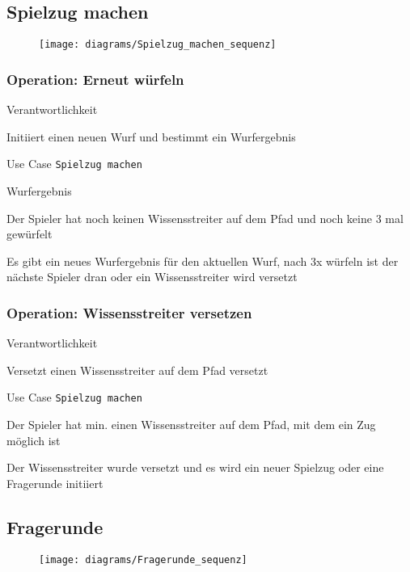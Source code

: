 \newpage
\subsection{Spielzug machen}
\begin{figure}[h]
  \begin{center}
    \texttt{[image: diagrams/Spielzug\_machen\_sequenz]}
  \end{center}
\end{figure}

\subsubsection{Operation: Erneut würfeln}
\begin{labeling}[:]{Verantwortlichkeit}
\item [Verantwortlichkeit] Initiiert einen neuen Wurf und bestimmt ein Wurfergebnis
\item [Referenzen] Use Case \texttt{Spielzug machen}
\item [Output] Wurfergebnis
\item [Vorbedingungen] Der Spieler hat noch keinen Wissensstreiter auf dem Pfad und noch keine 3 mal gewürfelt
\item [Nachbedingungen] Es gibt ein neues Wurfergebnis für den aktuellen Wurf, nach 3x würfeln ist der nächste Spieler dran oder ein Wissensstreiter wird versetzt
\end{labeling}

\subsubsection{Operation: Wissensstreiter versetzen}
\begin{labeling}[:]{Verantwortlichkeit}
\item [Verantwortlichkeit] Versetzt einen Wissensstreiter auf dem Pfad versetzt
\item [Referenzen] Use Case \texttt{Spielzug machen}
\item [Output] 
\item [Vorbedingungen] Der Spieler hat min. einen Wissensstreiter auf dem Pfad, mit dem ein Zug möglich ist
\item [Nachbedingungen] Der Wissensstreiter wurde versetzt und es wird ein neuer Spielzug oder eine Fragerunde initiiert
\end{labeling}

\newpage
\subsection{Fragerunde}
\begin{figure}[h]
  \begin{center}
    \texttt{[image: diagrams/Fragerunde\_sequenz]}
  \end{center}
\end{figure}

